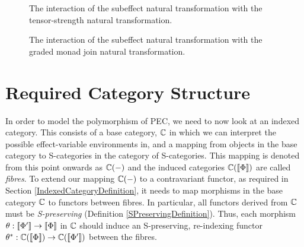 \documentclass{Report}
\begin{document}
\begin{figure}[H]
\centering
\begin{minipage}{0.45\textwidth}
    \qquad
    \caption{The interaction of the subeffect natural transformation with the tensor-strength natural transformation.}
    \label{SubeffectTensorStrength}
\end{minipage}  
\quad
\begin{minipage}{0.45\textwidth}
\caption{The interaction of the subeffect natural transformation with the graded monad join natural transformation.}
\label{SubeffectBind}
\end{minipage}  
\end{figure}


\section{Required Category Structure}\label{PECRequirements}
In order to model the polymorphism of PEC, we need to now look at an indexed category. This consists of a base category, $\mathbb{C}$ in which we can interpret the possible effect-variable environments in, and a mapping from objects in the base category to S-categories in the category of S-categories. This mapping is denoted from this point onwards as $\mathbb{C}(-)$ and the induced categories $\mathbb{C}({\bf [\![}\Phi{\bf ]\!]})$ are called \textit{fibres}. To extend our mapping $\mathbb{C}(-)$ to a contravariant functor, as required in Section \ref{IndexedCategoryDefinition}, it needs to map morphisms in the base category $\mathbb{C}$ to functors between fibres. In particular, all functors derived from $\mathbb{C}$ must be \textit{S-preserving} (Definition \ref{SPreservingDefinition}). Thus, each morphism $\theta: {\bf [\![}\Phi'{\bf ]\!]}\rightarrow{\bf [\![}\Phi{\bf ]\!]}$ in $\mathbb{C}$ should induce an S-preserving, re-indexing functor $\theta^*: \mathbb{C}({\bf [\![}\Phi{\bf ]\!]})\rightarrow\mathbb{C}({\bf [\![}\Phi'{\bf ]\!]})$ between the fibres.
\end{document}
